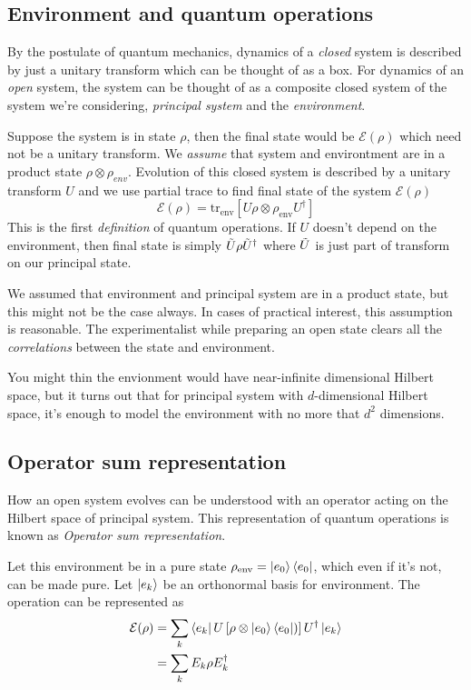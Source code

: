 \subsection{Environment and quantum operations}
By the postulate of quantum mechanics, dynamics of a \textit{closed} system is described by just a unitary transform which can be thought of as a box. For dynamics of an \textit{open} system, the system can be thought of as a composite closed system of the system we're considering, \textit{principal system} and the \textit{environment}. 

Suppose the system is in state $\rho$, then the final state would be $\mathcal{E}(\rho)$ which need not be a unitary transform. We \textit{assume} that system and environtment are in a product state $\rho \otimes \rho_{env}$. Evolution of this closed system is described by a unitary transform $U$ and we use partial trace to find final state of the system $\mathcal{E}(\rho)$
\begin{equation}
    \mathcal{E}(\rho) = \text{tr}_{\text{env}} \left[ U\rho \otimes \rho_{\text{env}} U^\dag \right]
\end{equation}
This is the first \textit{definition} of quantum operations. If $U$ doesn't depend on the environment, then final state is simply $\Tilde{U}\rho \Tilde{U}^\dag$ where $\Tilde{U}$ is just part of transform on our principal state.

We assumed that environment and principal system are in a product state, but this might not be the case always. In cases of practical interest, this assumption is reasonable. The experimentalist while preparing an open state clears all the \textit{correlations} between the state and environment.

You might thin the envionment would have near-infinite dimensional Hilbert space, but it turns out that for principal system with $d$-dimensional Hilbert space, it's enough to model the environment with no more that $d^2$ dimensions.

\subsection{Operator sum representation}
How an open system evolves can be understood with an operator acting on the Hilbert space of principal system. This representation of quantum operations is known as \textit{Operator sum representation}.

Let this environment be in a pure state $\rho_{\text{env}} = \ket{e_0}\bra{e_0}$, which even if it's not, can be made pure. Let $\ket{e_k}$ be an orthonormal basis for environment. The operation can be represented as
\begin{align}
    \mathcal{E}(\rho) &= \sum_k \bra{e_k} U\left[ \rho \otimes \ket{e_0}\bra{e_0}) \right] U^\dag \ket{e_k} \\
    &= \sum_k E_k \rho E_k^\dag
\end{align}

